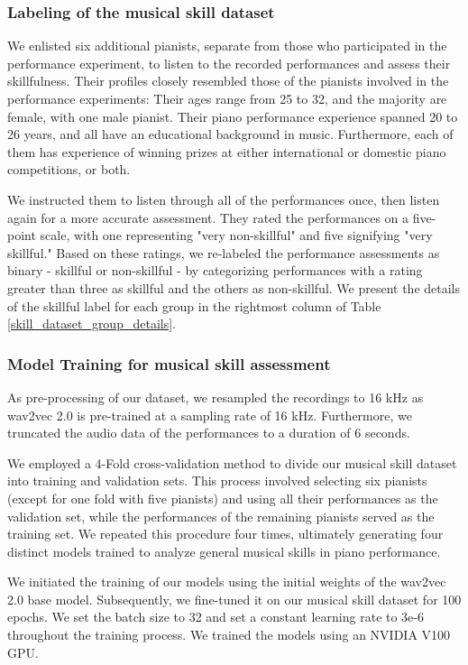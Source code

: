 \subsubsection*{Labeling of the musical skill dataset}
We enlisted six additional pianists, separate from those who participated in the performance experiment, to listen to the recorded performances and assess their skillfulness. 
Their profiles closely resembled those of the pianists involved in the performance experiments: Their ages range from 25 to 32, and the majority are female, with one male pianist. 
Their piano performance experience spanned 20 to 26 years, and all have an educational background in music. 
Furthermore, each of them has experience of winning prizes at either international or domestic piano competitions, or both.

We instructed them to listen through all of the performances once, then listen again for a more accurate assessment. 
They rated the performances on a five-point scale, with one representing "very non-skillful" and five signifying "very skillful." Based on these ratings, we re-labeled the performance assessments as binary - skillful or non-skillful - by categorizing performances with a rating greater than three as skillful and the others as non-skillful. 
We present the details of the skillful label for each group in the rightmost column of Table \ref{skill_dataset_group_details}.


\subsubsection*{Model Training for musical skill assessment}
As pre-processing of our dataset, we resampled the recordings to 16 kHz as wav2vec 2.0 is pre-trained at a sampling rate of 16 kHz.
Furthermore, we truncated the audio data of the performances to a duration of 6 seconds.

We employed a 4-Fold cross-validation method to divide our musical skill dataset into training and validation sets. 
This process involved selecting six pianists (except for one fold with five pianists) and using all their performances as the validation set, while the performances of the remaining pianists served as the training set. 
We repeated this procedure four times, ultimately generating four distinct models trained to analyze general musical skills in piano performance.

We initiated the training of our models using the initial weights of the wav2vec 2.0 base model. 
Subsequently, we fine-tuned it on our musical skill dataset for 100 epochs. 
We set the batch size to 32 and set a constant learning rate to 3e-6 throughout the training process. 
We trained the models using an NVIDIA V100 GPU.
